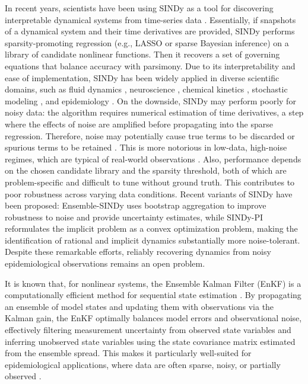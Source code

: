 \documentclass[9pt]{article}
\numberwithin{equation}{section}
\begin{document}
In recent years, scientists have been using SINDy as a tool for discovering interpretable dynamical systems from time-series data \cite{brunton}. Essentially, if snapshots of a dynamical system and their time derivatives are provided, SINDy performs sparsity-promoting regression (e.g., LASSO or sparse Bayesian inference) on a library of candidate nonlinear functions. Then it recovers a set of governing equations that balance accuracy with parsimony. Due to its interpretability and ease of implementation, SINDy has been widely applied in diverse scientific domains, such as fluid dynamics \cite{alrazen,fukami}, neuroscience \cite{muhammed,selvitella}, chemical kinetics \cite{guo,prabhu}, stochastic modeling \cite{lenfesty,breda}, and epidemiology \cite{babazadeh,jiang}. On the downside, SINDy may perform poorly for noisy data: the algorithm requires numerical estimation of time derivatives, a step where the effects of noise are amplified before propagating into the sparse regression. Therefore, noise may potentially cause true terms to be discarded or spurious terms to be retained \cite{fasel,kaheman}. This is more notorious in low-data, high-noise regimes, which are typical of real-world observations \cite{fasel2}. Also, performance depends on the chosen candidate library and the sparsity threshold, both of which are problem-specific and difficult to tune without ground truth. This contributes to poor robustness across varying data conditions. Recent variants of SINDy have been proposed: Ensemble-SINDy \cite{fasel2} uses bootstrap aggregation to improve robustness to noise and provide uncertainty estimates, while SINDy-PI \cite{kaheman2} reformulates the implicit problem as a convex optimization problem, making the identification of rational and implicit dynamics substantially more noise-tolerant. Despite these remarkable efforts, reliably recovering dynamics from noisy epidemiological observations remains an open problem.

It is known that, for nonlinear systems, the Ensemble Kalman Filter (EnKF) is a computationally efficient method for sequential state estimation \cite{evensen}. By propagating an ensemble of model states and updating them with observations via the Kalman gain, the EnKF optimally balances model errors and observational noise, effectively filtering measurement uncertainty from observed state variables and inferring unobserved state variables using the state covariance matrix estimated from the ensemble spread. This makes it particularly well-suited for epidemiological applications, where data are often sparse, noisy, or partially observed \cite{abbas, belgraoui, lal}.
\end{document}
